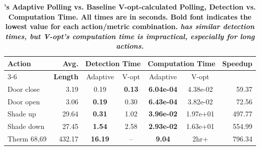 \begin{table}[tb!]
    \centering
    \small
    \renewcommand{\arraystretch}{1.02}
    \caption{\bf \small {\sysname's Adaptive Polling vs. Baseline V-opt-calculated Polling, Detection vs. Computation Time. All times are in seconds. Bold font indicates the lowest value for each action/metric combination. \it \sysname{} has similar detection times, but V-opt's computation time is impractical, especially for long actions.}}
    \bigskip
    \label{rasc:tab:V-opt}
    \begin{tabular}{|l||r|c|c|c|c|r|}
        \hline
        \multirow{2}{*}{\textbf{Action}} & \centering \textbf{Avg.} & \multicolumn{2}{c|}{\textbf{Detection Time}} & \multicolumn{2}{c|}{\textbf{Computation Time}} & \multirow{2}{*}{\textbf{Speedup}} \\
        \cline{3-6}  %
           & \textbf{Length} &      Adaptive &  V-opt         & Adaptive          & V-opt     & \\
        \hline\hline
        Door close  &   3.19 & 0.19          & \textbf{0.13} & \textbf{6.04e-04} & 4.38e-02 & 59.37 \\ \hline
        Door open   &   3.06 & \textbf{0.19} &  0.30         & \textbf{6.43e-04} & 3.82e-02 & 72.56 \\ \hline
        Shade up    &  29.64 & \textbf{0.31} &  1.02         & \textbf{3.96e-02} & 1.97e+01 & 497.77 \\ \hline
        Shade down  &  27.45 & \textbf{1.54} &  2.58         & \textbf{2.93e-02} & 1.63e+01 & 554.99 \\ \hline
        Therm 68,69 & 432.17 & \textbf{16.19}&    --         & \textbf{9.04}     & {2hr+}   & 796.34 \\ \hline
    \end{tabular}
\end{table}

